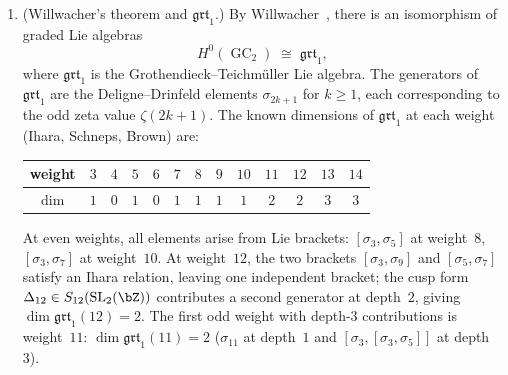 \begin{conjecture}
\begin{enumerate}[label=\textup{(\roman*)}]
\item \textup{(Willwacher's theorem and $\mathfrak{grt}_1$.)}
 By Willwacher~\textup{\cite{Willwacher15}}, there is an
 isomorphism of graded Lie algebras
 \[
 H^0(\operatorname{GC}_2) \;\cong\; \mathfrak{grt}_1,
 \]
 where $\mathfrak{grt}_1$ is the
 Grothendieck--Teichm\"uller Lie algebra.
 The generators of $\mathfrak{grt}_1$ are the
 Deligne--Drinfeld elements $\sigma_{2k+1}$ for $k \geq 1$,
 each corresponding to the odd zeta value $\zeta(2k+1)$.
 The known dimensions of $\mathfrak{grt}_1$ at each weight
 \textup{(}Ihara, Schneps, Brown\textup{)} are:
 \begin{center}
 \renewcommand{\arraystretch}{1.15}
 \begin{tabular}{c|cccccccccccc}
 weight & $3$ & $4$ & $5$ & $6$ & $7$ & $8$ & $9$ & $10$ & $11$ & $12$ & $13$ & $14$ \\
 \hline
 $\dim$ & $1$ & $0$ & $1$ & $0$ & $1$ & $1$ & $1$ & $1$ & $2$ & $2$ & $3$ & $3$
 \end{tabular}
 \end{center}
 At even weights, all elements arise from Lie brackets:
 $[\sigma_3, \sigma_5]$ at weight~$8$,
 $[\sigma_3, \sigma_7]$ at weight~$10$.
 At weight~$12$, the two brackets
 $[\sigma_3, \sigma_9]$ and $[\sigma_5, \sigma_7]$ satisfy
 an Ihara relation, leaving one independent bracket; the
 cusp form $\Delta_{12} \in S_{12}(\mathrm{SL}_2(\bZ))$
 contributes a second generator at depth~$2$, giving
 $\dim \mathfrak{grt}_1(12) = 2$.
 The first odd weight with depth-$3$ contributions is
 weight~$11$: $\dim \mathfrak{grt}_1(11) = 2$
 \textup{(}$\sigma_{11}$ at depth~$1$ and
 $[\sigma_3, [\sigma_3, \sigma_5]]$ at depth~$3$\textup{)}.


\end{enumerate}
\end{conjecture}
